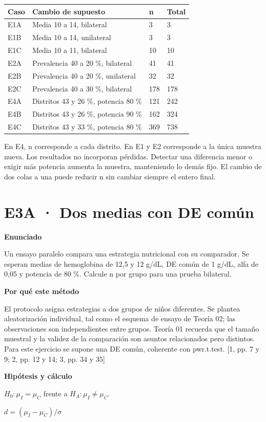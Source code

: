 \documentclass[10pt,a4paper]{article}
\newcommand{\etiqueta}[1]{\par{\bfseries\color{Blue}#1}\par}
\begin{document}
\begingroup\small\begin{longtable}{@{}p{16mm}p{105mm}p{17mm}p{17mm}@{}}\toprule
Caso & Cambio de supuesto & n & Total\\\midrule
E1A & Media 10 a 14, bilateral & 3 & 3\\
E1B & Media 10 a 14, unilateral & 3 & 3\\
E1C & Media 10 a 11, bilateral & 10 & 10\\
E2A & Prevalencia 40 a 20 \%, bilateral & 41 & 41\\
E2B & Prevalencia 40 a 20 \%, unilateral & 32 & 32\\
E2C & Prevalencia 40 a 30 \%, bilateral & 178 & 178\\
E4A & Distritos 43 y 26 \%, potencia 80 \% & 121 & 242\\
E4B & Distritos 43 y 26 \%, potencia 90 \% & 162 & 324\\
E4C & Distritos 43 y 33 \%, potencia 80 \% & 369 & 738\\
\bottomrule\end{longtable}\endgroup

En E4, n corresponde a cada distrito. En E1 y E2 corresponde a la única muestra nueva. Los resultados no incorporan pérdidas. Detectar una diferencia menor o exigir más potencia aumenta la muestra, manteniendo lo demás fijo. El cambio de dos colas a una puede reducir n sin cambiar siempre el entero final.

\clearpage
\section*{E3A · Dos medias con DE común}
\etiqueta{Enunciado}
Un ensayo paralelo compara una estrategia nutricional con su comparador. Se esperan medias de hemoglobina de 12,5 y 12 g/dL, DE común de 1 g/dL, alfa de 0,05 y potencia de 80 \%. Calcule n por grupo para una prueba bilateral.
\etiqueta{Por qué este método}
El protocolo asigna estrategias a dos grupos de niños diferentes. Se plantea aleatorización individual, tal como el esquema de ensayo de Teoría 02; las observaciones son independientes entre grupos. Teoría 01 recuerda que el tamaño muestral y la validez de la comparación son asuntos relacionados pero distintos. Para este ejercicio se supone una DE común, coherente con pwr.t.test. [1, pp. 7 y 9; 2, pp. 12 y 14; 3, pp. 34 y 35]
\etiqueta{Hipótesis y cálculo}
$H_0:\mu_I=\mu_C$ frente a $H_A:\mu_I\ne\mu_C$.

$d=(\mu_I-\mu_C)/\sigma$
\end{document}

